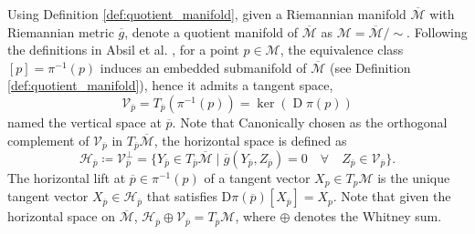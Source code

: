 \begin{definition}\label{def:horizontal_vertical_space}
    Using Definition \ref{def:quotient_manifold}, given a Riemannian manifold $\overline{\mathcal{M}}$ with Riemannian metric $\overline{g}$, denote a quotient manifold of $\overline{\mathcal{M}}$ as $\mathcal{M}=\overline{\mathcal{M}}/\sim$. Following the definitions in Absil et al. \cite[p.~43]{AbsilMahonySepulchre2008}, for a point $p\in \mathcal{M}$, the equivalence class $[p]=\pi^{-1}(p)$ induces an embedded submanifold of $\overline{\mathcal{M}}$ (see Definition \ref{def:quotient_manifold}), hence it admits a tangent space,
    \begin{equation*}
        \mathcal{V}_{\overline{p}}=T_{\overline{p}}(\pi^{-1}(p))=\operatorname{ker}(\operatorname{D}\pi(p))
    \end{equation*}
    \cite[p.~4]{JensenZimmermann2024}named the \textup{vertical space} at $\overline{p}$. Note that Canonically chosen as the orthogonal complement of $\mathcal{V}_{\overline{p}}$ in $T_{\overline{p}}\overline{\mathcal{M}}$, the \textup{horizontal space} \cite[p.~48]{AbsilMahonySepulchre2008} is defined as %
    \begin{equation*}
        \mathcal{H}_{\overline{p}}\coloneqq \mathcal{V}_{\overline{p}}^\perp=\{Y_{\overline{p}}\in T_{\overline{p}}\overline{\mathcal{M}} \;|\; \overline{g}(Y_{\overline{p}},Z_{\overline{p}})=0\quad\forall\quad Z_{\overline{p}}\in \mathcal{V}_{\overline{p}} \}.
    \end{equation*}
    The \textup{horizontal lift} at $\overline{p}\in\pi^{-1}(p)$ of a tangent vector $X_{p}\in T_{p}\mathcal{M}$ is the unique tangent vector $X_{\overline{p}}\in \mathcal{H}_{\overline{p}}$ that satisfies $\mathrm{D}\pi(\overline{p})[{X}_{\overline{p}}]=X_p$. Note that given the horizontal space on $\overline{\mathcal{M}}$, $\mathcal{H}_{\overline{p}}\oplus \mathcal{V}_{\overline{p}}=T_{\overline{p}}\mathcal{M}$, where $\oplus$ denotes the Whitney sum. 
\end{definition}


